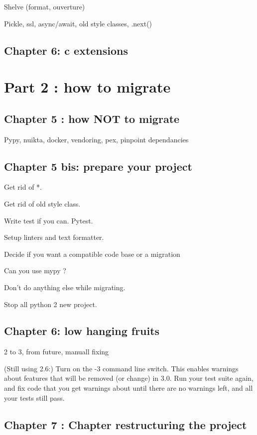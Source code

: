 \documentclass[paperwidth=8in, paperheight=10in,lang=en]{elegantbook}
\begin{document}
Shelve (format, ouverture)


Pickle, ssl, async/await, old style classes, .next()

\chapter{Chapter 6:  c extensions}

\part{Part 2 : how to migrate}

\chapter{Chapter 5 : how NOT to migrate}

Pypy, nuikta, docker, vendoring, pex, pinpoint dependancies

\chapter{Chapter 5 bis: prepare your project}

Get rid of *.

Get rid of old style class.

Write test if you can. Pytest.

Setup linters and text formatter.

Decide if you want a compatible code base or a migration

Can you use mypy ?

Don't do anything else while migrating.

Stop all python 2 new project.

\chapter{Chapter 6: low hanging fruits}

2 to 3, from future, manuall fixing

(Still using 2.6:) Turn on the -3 command line switch. This enables warnings about features that will be removed (or change) in 3.0. Run your test suite again, and fix code that you get warnings about until there are no warnings left, and all your tests still pass.

\chapter{Chapter 7 : Chapter restructuring the project}
\end{document}

